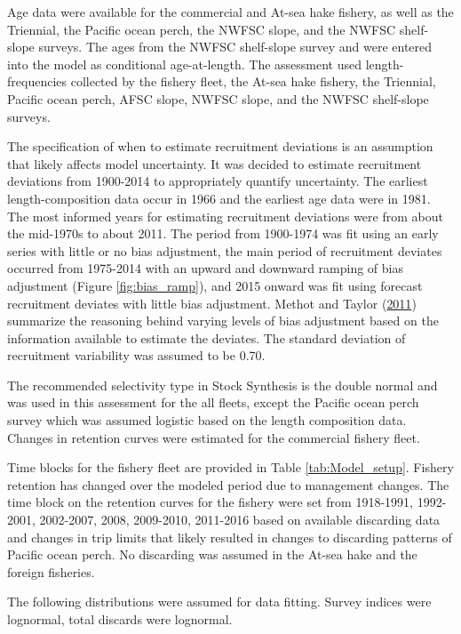 \documentclass[12pt,]{article}
\begin{document}
Age data were available for the commercial and At-sea hake fishery, as
well as the Triennial, the Pacific ocean perch, the NWFSC slope, and the
NWFSC shelf-slope surveys. The ages from the NWFSC shelf-slope survey
and were entered into the model as conditional age-at-length. The
assessment used length-frequencies collected by the fishery fleet, the
At-sea hake fishery, the Triennial, Pacific ocean perch, AFSC slope,
NWFSC slope, and the NWFSC shelf-slope surveys.

The specification of when to estimate recruitment deviations is an
assumption that likely affects model uncertainty. It was decided to
estimate recruitment deviations from 1900-2014 to appropriately quantify
uncertainty. The earliest length-composition data occur in 1966 and the
earliest age data were in 1981. The most informed years for estimating
recruitment deviations were from about the mid-1970s to about 2011. The
period from 1900-1974 was fit using an early series with little or no
bias adjustment, the main period of recruitment deviates occurred from
1975-2014 with an upward and downward ramping of bias adjustment (Figure
\ref{fig:bias_ramp}), and 2015 onward was fit using forecast recruitment
deviates with little bias adjustment. Methot and Taylor
(\protect\hyperlink{ref-methot_adjusting_2011}{2011}) summarize the
reasoning behind varying levels of bias adjustment based on the
information available to estimate the deviates. The standard deviation
of recruitment variability was assumed to be 0.70.

The recommended selectivity type in Stock Synthesis is the double normal
and was used in this assessment for the all fleets, except the Pacific
ocean perch survey which was assumed logistic based on the length
composition data. Changes in retention curves were estimated for the
commercial fishery fleet.

Time blocks for the fishery fleet are provided in Table
\ref{tab:Model_setup}. Fishery retention has changed over the modeled
period due to management changes. The time block on the retention curves
for the fishery were set from 1918-1991, 1992-2001, 2002-2007, 2008,
2009-2010, 2011-2016 based on available discarding data and changes in
trip limits that likely resulted in changes to discarding patterns of
Pacific ocean perch. No discarding was assumed in the At-sea hake and
the foreign fisheries.

The following distributions were assumed for data fitting. Survey
indices were lognormal, total discards were lognormal.
\end{document}
